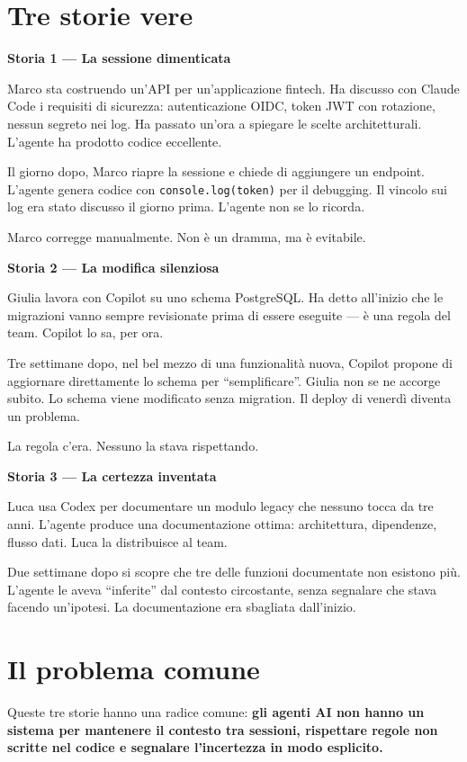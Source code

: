 \section*{Tre storie vere}

\textbf{Storia 1 --- La sessione dimenticata}

Marco sta costruendo un'API per un'applicazione fintech. Ha discusso con Claude Code i requisiti di sicurezza: autenticazione OIDC, token JWT con rotazione, nessun segreto nei log. Ha passato un'ora a spiegare le scelte architetturali. L'agente ha prodotto codice eccellente.

Il giorno dopo, Marco riapre la sessione e chiede di aggiungere un endpoint. L'agente genera codice con \texttt{console.log(token)} per il debugging. Il vincolo sui log era stato discusso il giorno prima. L'agente non se lo ricorda.

Marco corregge manualmente. Non è un dramma, ma è evitabile.

\textbf{Storia 2 --- La modifica silenziosa}

Giulia lavora con Copilot su uno schema PostgreSQL. Ha detto all'inizio che le migrazioni vanno sempre revisionate prima di essere eseguite --- è una regola del team. Copilot lo sa, per ora.

Tre settimane dopo, nel bel mezzo di una funzionalità nuova, Copilot propone di aggiornare direttamente lo schema per ``semplificare''. Giulia non se ne accorge subito. Lo schema viene modificato senza migration. Il deploy di venerdì diventa un problema.

La regola c'era. Nessuno la stava rispettando.

\textbf{Storia 3 --- La certezza inventata}

Luca usa Codex per documentare un modulo legacy che nessuno tocca da tre anni. L'agente produce una documentazione ottima: architettura, dipendenze, flusso dati. Luca la distribuisce al team.

Due settimane dopo si scopre che tre delle funzioni documentate non esistono più. L'agente le aveva ``inferite'' dal contesto circostante, senza segnalare che stava facendo un'ipotesi. La documentazione era sbagliata dall'inizio.

\section*{Il problema comune}

Queste tre storie hanno una radice comune: \textbf{gli agenti AI non hanno un sistema per mantenere il contesto tra sessioni, rispettare regole non scritte nel codice e segnalare l'incertezza in modo esplicito.}

